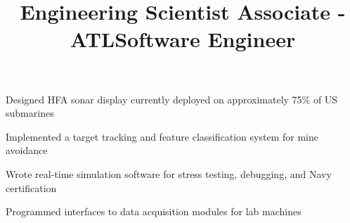 \documentclass[12pt, tweaklist, line]{res}
\let\tempone\itemize
\let\temptwo\enditemize
\renewenvironment{itemize}{\tempone\vspace{-.15in}\setlength{\topsep}{0pt}\setlength{\itemsep}{3pt}\vspace{-.15in}}{\temptwo}
\def\Cplusplus{{\rm C\raise.5ex\hbox{\small ++}}}
\begin{document}
\begin{resume}
\title{Engineering Scientist Associate - ATL}
\begin{position}
\begin{itemize}
\item Designed HFA sonar display currently deployed on approximately 75\% of US submarines %
\item Implemented a target tracking and feature classification system for mine avoidance
\item Wrote real-time simulation software for stress testing, debugging, and Navy certification
\end{itemize}
\end{position}

\title{Software Engineer}
\begin{position}
\begin{itemize}
\item Programmed interfaces to data acquisition modules for lab machines
\end{itemize}
\end{position}


\end{resume}
\end{document}
